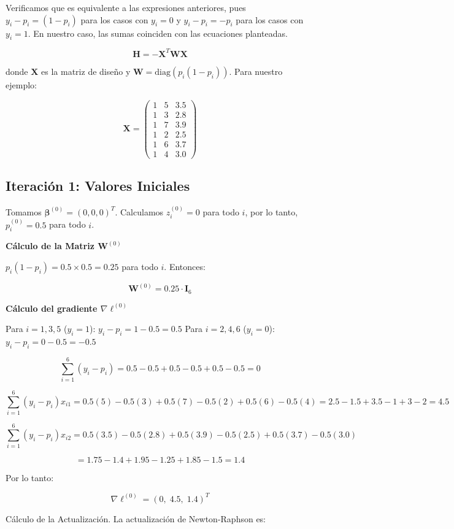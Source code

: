 \documentclass[12pt]{article}
\begin{document}
Verificamos que es equivalente a las expresiones anteriores, pues $y_i - p_i = (1-p_i)$ para los casos con $y_i=0$ y $y_i - p_i = -p_i$ para los casos con $y_i=1$. En nuestro caso, las sumas coinciden con las ecuaciones planteadas.


\[
\mathbf{H} = -\mathbf{X}^T \mathbf{W} \mathbf{X}
\]

donde $\mathbf{X}$ es la matriz de diseño y $\mathbf{W} = \text{diag}(p_i(1-p_i))$. Para nuestro ejemplo:

\[
\mathbf{X} = 
\begin{pmatrix}
1 & 5 & 3.5 \\
1 & 3 & 2.8 \\
1 & 7 & 3.9 \\
1 & 2 & 2.5 \\
1 & 6 & 3.7 \\
1 & 4 & 3.0
\end{pmatrix}
\]

\subsection{Iteración 1: Valores Iniciales}

Tomamos $\boldsymbol{\beta}^{(0)} = (0, 0, 0)^T$. Calculamos $z_i^{(0)} = 0$ para todo $i$, por lo tanto, $p_i^{(0)} = 0.5$ para todo $i$.

\textbf{Cálculo de la Matriz $\mathbf{W}^{(0)}$}

$p_i(1-p_i) = 0.5 \times 0.5 = 0.25$ para todo $i$. Entonces:

\[
\mathbf{W}^{(0)} = 0.25 \cdot \mathbf{I}_6
\]

\textbf{Cálculo del gradiente $\nabla \ell^{(0)}$}

Para $i=1,3,5$ ($y_i=1$): $y_i - p_i = 1 - 0.5 = 0.5$
Para $i=2,4,6$ ($y_i=0$): $y_i - p_i = 0 - 0.5 = -0.5$

\[
\sum_{i=1}^{6} (y_i - p_i) = 0.5 - 0.5 + 0.5 - 0.5 + 0.5 - 0.5 = 0
\]

\[
\sum_{i=1}^{6} (y_i - p_i) x_{i1} = 0.5(5) - 0.5(3) + 0.5(7) - 0.5(2) + 0.5(6) - 0.5(4) = 2.5 - 1.5 + 3.5 - 1 + 3 - 2 = 4.5
\]

\[
\sum_{i=1}^{6} (y_i - p_i) x_{i2} = 0.5(3.5) - 0.5(2.8) + 0.5(3.9) - 0.5(2.5) + 0.5(3.7) - 0.5(3.0)
\]

\[
= 1.75 - 1.4 + 1.95 - 1.25 + 1.85 - 1.5 = 1.4
\]

Por lo tanto:

\[
\nabla \ell^{(0)} = (0, \; 4.5, \; 1.4)^T
\]

Cálculo de la Actualización. La actualización de Newton-Raphson es:
\end{document}
